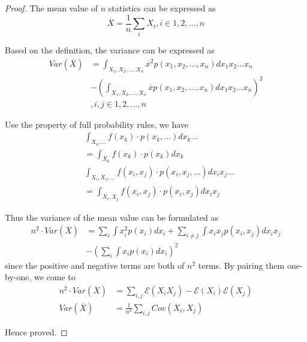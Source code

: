 \documentclass[../concepts.tex]{subfiles}
\begin{document}
\begin{proof}
    The mean value of $n$ statistics can be expressed as
    \begin{equation*}
        \overline{X} = \frac{1}{n} \sum_{i} X_i,
        i \in 1, 2, \dots, n
    \end{equation*}

    Based on the definition, the variance can be expressed as
    \begin{align*}
        Var(\overline{X}) & =  \int_{X_1, X_2, \dots, X_n} {\overline{x}}^2 p(x_1, x_2, \dots, x_n) dx_1 x_2 \dots x_n \\
                          & - (\int_{X_1, X_2, \dots, X_n} \overline{x} p(x_1, x_2, \dots, x_n) dx_1 x_2 \dots x_n)^2  \\
                          & , i, j \in 1, 2, \dots, n
    \end{align*}

    Use the property of full probability rules, we have
    \begin{align*}
         & \int_{X_k, \dots} f(x_k) \cdot p(x_k, \dots) dx_k \dots                    \\
         & = \int_{X_k} f(x_k) \cdot p(x_k) dx_k                                      \\
         & \int_{X_i, X_j, \dots} f(x_i, x_j) \cdot p(x_i, x_j, \dots) dx_i x_j \dots \\
         & = \int_{X_i, X_j} f(x_i, x_j) \cdot p(x_i, x_j) dx_i x_j
    \end{align*}

    Thus the variance of the mean value can be formulated as
    \begin{align*}
        n^2 \cdot Var(\overline{X}) & = \sum_i \int x_i^2 p(x_i) dx_i + \sum_{i \neq j} \int x_i x_j p(x_i, x_j) dx_i x_j \\
                                    & - (\sum_i \int x_i p(x_i) dx_i)^2
    \end{align*}
    since the positive and negative terms are both of $n^2$ terms.
    By pairing them one-by-one, we come to
    \begin{align*}
        n^2 \cdot Var(\overline{X}) & = \sum_{i, j} \mathcal{E}(X_i X_j) - \mathcal{E}(X_i)\mathcal{E}(X_j) \\
        Var(\overline{X})           & = \frac{1}{n^2} \sum_{i, j} Cov(X_i, X_j)
    \end{align*}

    Hence proved.
\end{proof}
\end{document}
